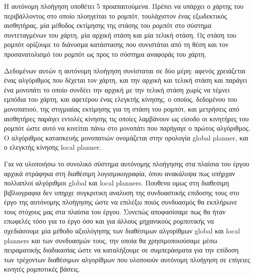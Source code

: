 \documentclass[a4paper,10pt]{article}
\begin{document}
Η αυτόνομη πλοήγηση υποθέτει 5
προαπαιτούμενα.  Πρέπει να υπάρχει ο χάρτης του περιβάλλοντος στο οποίο
πλοηγείται το ρομπότ, τουλάχιστον ένας εξωδεκτικός αισθητήρας, μία μέθοδος
εκτίμησης της στάσης του ρομπότ στο σύστημα συντεταγμένων του χάρτη, μία αρχική
στάση και μία τελική στάση. Ως στάση του ρομπότ ορίζουμε το διάνυσμα κατάστασης
που συνιστάται από τη θέση και τον προσανατολισμό του ρομπότ ως προς το σύστημα
αναφοράς του χάρτη.

Δεδομένων αυτών η αυτόνομη πλοήγηση συνίσταται σε δύο
μέρη: αφενός χρειάζεται ένας αλγόριθμος που δέχεται τον χάρτη, και την αρχική
και τελική στάση και παράγει ένα μονοπάτι το οποίο συνδέει την αρχική με την
τελική στάση χωρίς να τέμνει εμπόδια του χάρτη, και αφετέρου ένας ελεγκτής
κίνησης, ο οποίος, δεδομένου του μονοπατιού, της στιγμιαίας εκτίμησης για τη
στάση του ρομπότ, και μετρήσεις από αισθητήρες παράγει εντολές κίνησης τις
οποίες λαμβάνουν ως είσοδο οι κινητήρες του ρομπότ ώστε αυτό να κινείται πάνω
στο μονοπάτι που παρήγαγε ο πρώτος αλγόριθμος. Ο αλγόριθμος κατασκευής
μονοπατιών ονομάζεται στην ορολογία global planner, και ο ελεγκτής κίνησης
local planner.

Για να υλοποιήσω το συνολικό σύστημα αυτόνομης πλοήγησης στα πλαίσια του έργου
αρχικά στράφηκα στη διαθέσιμη λογισμικογραφία, όπου ανακάλυψα πως υπήρχαν
πολλαπλοί αλγόριθμοι global και local planners. Πουθενα ομως στη διαθεσιμη
βιβλιογραφια δεν υπηρχε συγκριτικη αναλυση της συνδυαστικής επιδοσης τους στο
έργο της αυτόνομης πλοήγησης ώστε να επιλέξω ποιός συνδυασμός θα εκπλήρωνε τους
στόχους μας στα πλαίσια του έργου. Συνεπώς αποφασίσαμε πως θα ήταν επωφελές
τόσο για το έργο όσο και για άλλους μηχανικούς ρομποτικής να σχεδιάσουμε μία
μέθοδο αξιολόγησης των διαθέσιμων αλγορίθμων global και local planners και των
συνδυασμών τους, την οποία θα χρησιμοποιούσαμε μέσω πειραματικής διαδικασίας
ώστε να καταλήξουμε σε συμπεράσματα για την επίδοση των τρέχοντων διαθέσιμων
αλγορίθμων που υλοποιούν αυτόνομη πλοήγηση σε επίγειες κινητές ρομποτικές
βάσεις.
\end{document}
